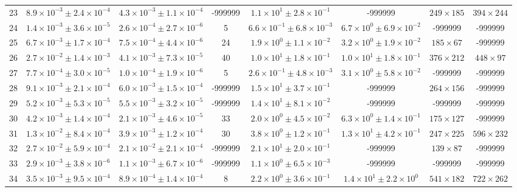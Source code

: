 \begin{table}
\begin{tabular}{cccccccc}
23 & $8.9\times10^{-3}\pm 2.4\times10^{-4}$ & $4.3\times10^{-3}\pm 1.1\times10^{-4}$ & -999999 & $1.1\times10^{1}\pm 2.8\times10^{-1}$ & -999999 & $249\times 185$ & $394\times 244$ \\
24 & $1.4\times10^{-3}\pm 3.6\times10^{-5}$ & $2.6\times10^{-4}\pm 2.7\times10^{-6}$ & 5 & $6.6\times10^{-1}\pm 6.8\times10^{-3}$ & $6.7\times10^{0}\pm 6.9\times10^{-2}$ & -999999 & -999999 \\
25 & $6.7\times10^{-3}\pm 1.7\times10^{-4}$ & $7.5\times10^{-4}\pm 4.4\times10^{-6}$ & 24 & $1.9\times10^{0}\pm 1.1\times10^{-2}$ & $3.2\times10^{0}\pm 1.9\times10^{-2}$ & $185\times 67$ & -999999 \\
26 & $2.7\times10^{-2}\pm 1.4\times10^{-3}$ & $4.1\times10^{-3}\pm 7.3\times10^{-5}$ & 40 & $1.0\times10^{1}\pm 1.8\times10^{-1}$ & $1.0\times10^{1}\pm 1.8\times10^{-1}$ & $376\times 212$ & $448\times 97$ \\
27 & $7.7\times10^{-4}\pm 3.0\times10^{-5}$ & $1.0\times10^{-4}\pm 1.9\times10^{-6}$ & 5 & $2.6\times10^{-1}\pm 4.8\times10^{-3}$ & $3.1\times10^{0}\pm 5.8\times10^{-2}$ & -999999 & -999999 \\
28 & $9.1\times10^{-3}\pm 2.1\times10^{-4}$ & $6.0\times10^{-3}\pm 1.5\times10^{-4}$ & -999999 & $1.5\times10^{1}\pm 3.7\times10^{-1}$ & -999999 & $264\times 156$ & -999999 \\
29 & $5.2\times10^{-3}\pm 5.3\times10^{-5}$ & $5.5\times10^{-3}\pm 3.2\times10^{-5}$ & -999999 & $1.4\times10^{1}\pm 8.1\times10^{-2}$ & -999999 & -999999 & -999999 \\
30 & $4.2\times10^{-3}\pm 1.4\times10^{-4}$ & $2.1\times10^{-3}\pm 4.6\times10^{-5}$ & 33 & $2.0\times10^{0}\pm 4.5\times10^{-2}$ & $6.3\times10^{0}\pm 1.4\times10^{-1}$ & $175\times 127$ & -999999 \\
31 & $1.3\times10^{-2}\pm 8.4\times10^{-4}$ & $3.9\times10^{-3}\pm 1.2\times10^{-4}$ & 30 & $3.8\times10^{0}\pm 1.2\times10^{-1}$ & $1.3\times10^{1}\pm 4.2\times10^{-1}$ & $247\times 225$ & $596\times 232$ \\
32 & $2.7\times10^{-2}\pm 5.9\times10^{-4}$ & $2.1\times10^{-2}\pm 2.1\times10^{-4}$ & -999999 & $2.1\times10^{1}\pm 2.0\times10^{-1}$ & -999999 & $139\times 87$ & -999999 \\
33 & $2.9\times10^{-3}\pm 3.8\times10^{-6}$ & $1.1\times10^{-3}\pm 6.7\times10^{-6}$ & -999999 & $1.1\times10^{0}\pm 6.5\times10^{-3}$ & -999999 & -999999 & -999999 \\
34 & $3.5\times10^{-3}\pm 9.5\times10^{-4}$ & $8.9\times10^{-4}\pm 1.4\times10^{-4}$ & 8 & $2.2\times10^{0}\pm 3.6\times10^{-1}$ & $1.4\times10^{1}\pm 2.2\times10^{0}$ & $541\times 182$ & $722\times 262$ \\

\end{tabular}
\end{table}
